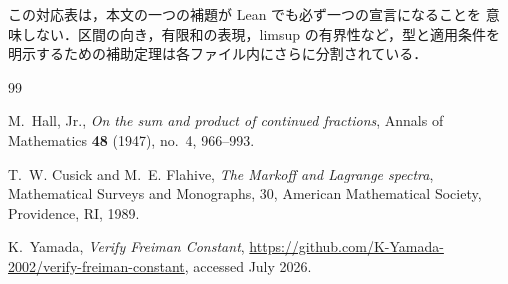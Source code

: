 \documentclass[10pt,a4paper]{ujarticle}
\begin{document}
この対応表は，本文の一つの補題が Lean でも必ず一つの宣言になることを
意味しない．区間の向き，有限和の表現，limsup の有界性など，型と適用条件を
明示するための補助定理は各ファイル内にさらに分割されている．

\begin{thebibliography}{99}
\raggedright
{}
M.~Hall, Jr.,
\textit{On the sum and product of continued fractions},
Annals of Mathematics \textbf{48} (1947), no.~4, 966--993.

T.~W. Cusick and M.~E. Flahive,
\textit{The Markoff and Lagrange spectra},
Mathematical Surveys and Monographs, 30,
American Mathematical Society, Providence, RI, 1989.

K.~Yamada,
\textit{Verify Freiman Constant},
\url{https://github.com/K-Yamada-2002/verify-freiman-constant},
accessed July 2026.
\end{thebibliography}
\end{document}
